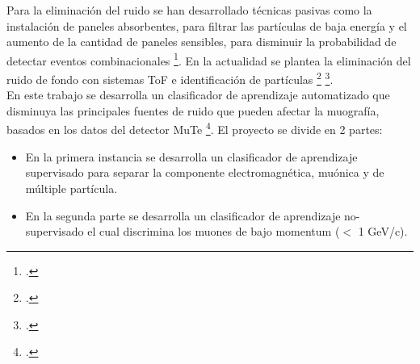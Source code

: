{\begin{description}
Para la eliminación del ruido se han desarrollado técnicas pasivas como la instalación de paneles absorbentes, para filtrar las partículas de baja energía y el aumento de la cantidad de paneles sensibles, para disminuir la probabilidad de detectar eventos combinacionales \footcite{Lesparre2012}. En la actualidad se plantea la eliminación del ruido de fondo con  sistemas ToF e identificación de partículas \footcite{mounes que impactan en el detector por la parte de posterior.} \footcite{Marteau2014, Cimmino2017}. \\

En este trabajo se desarrolla un clasificador de aprendizaje automatizado que disminuya las principales fuentes de ruido que pueden afectar la muografía, basados en los datos del detector MuTe \footcite{inproceedings}. El proyecto se divide en 2 partes:

\begin{itemize}
    
    \item En la primera instancia se desarrolla un clasificador de aprendizaje supervisado para separar la componente electromagnética, muónica y de múltiple partícula.
    
    \item En la segunda parte se desarrolla un clasificador de aprendizaje no-supervisado el cual discrimina los muones de bajo momentum ($<$ 1 GeV/c).   
\end{itemize}
\end{description}}\normalsize
